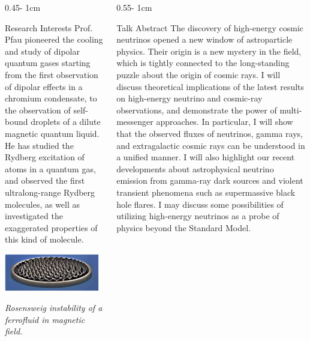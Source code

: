 \documentclass{../psuposter}
\begin{document}
\begin{frame}
\begin{columns}[t, totalwidth=\textwidth]
\begin{column}{0.45\textwidth - 1cm}
    \begin{block}{Research Interests}
        Prof. Pfau pioneered the cooling and study of dipolar quantum gases starting from the first observation of dipolar effects in a chromium condensate, to the observation of self-bound droplets of a dilute magnetic quantum liquid. He has studied the Rydberg excitation of atoms in a quantum gas, and observed the first ultralong-range Rydberg molecules, as well as investigated the exaggerated properties of this kind of molecule. 
        \begin{center}
	    	\includegraphics[width=0.95\textwidth]{images/ferro}    		
    	\end{center}
    	\textit{Rosensweig instability of a ferrofluid in magnetic field.} \cite{lahayePhysicsDipolarBosonic2009}
    \end{block}
\end{column}
\begin{column}{0.55\textwidth - 1cm}


    \begin{block}{Talk Abstract}
         The discovery of high-energy cosmic neutrinos opened a new window of astroparticle physics. Their origin is a new mystery in the field, which is tightly connected to the long-standing puzzle about the origin of cosmic rays. I will discuss theoretical implications of the latest results on high-energy neutrino and cosmic-ray observations, and demonstrate the power of multi-messenger approaches. In particular, I will show that the observed fluxes of neutrinos, gamma rays, and extragalactic cosmic rays can be understood in a unified manner. I will also highlight our recent developments about astrophysical neutrino emission from gamma-ray dark sources and violent transient phenomena such as supermassive black hole flares. I may discuss some possibilities of utilizing high-energy neutrinos as a probe of physics beyond the Standard Model.
    \end{block}



\end{column}
\end{columns}
\end{frame}
\end{document}
